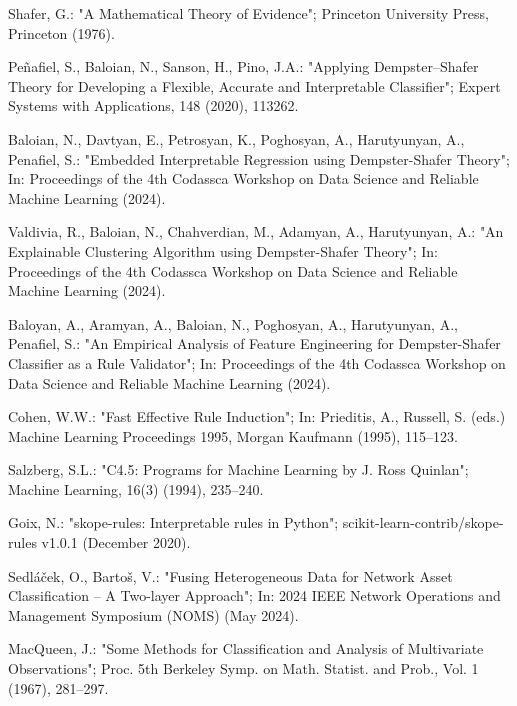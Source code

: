 \documentclass[10pt,a4paper,oneside]{article}
\begin{document}
\begin{thebibliography}{}{
\fontsize{9pt}{10pt}\selectfont
{}
Shafer, G.: "A Mathematical Theory of Evidence";
Princeton University Press, Princeton (1976).

Peñafiel, S., Baloian, N., Sanson, H., Pino, J.A.: "Applying Dempster–Shafer Theory for Developing a Flexible, Accurate and Interpretable Classifier";
Expert Systems with Applications, 148 (2020), 113262.

Baloian, N., Davtyan, E., Petrosyan, K., Poghosyan, A., Harutyunyan, A., Penafiel, S.:
"Embedded Interpretable Regression using Dempster-Shafer Theory";
In: Proceedings of the 4th Codassca Workshop on Data Science and Reliable Machine Learning (2024).

Valdivia, R., Baloian, N., Chahverdian, M., Adamyan, A., Harutyunyan, A.:
"An Explainable Clustering Algorithm using Dempster-Shafer Theory";
In: Proceedings of the 4th Codassca Workshop on Data Science and Reliable Machine Learning (2024).

Baloyan, A., Aramyan, A., Baloian, N., Poghosyan, A., Harutyunyan, A., Penafiel, S.:
"An Empirical Analysis of Feature Engineering for Dempster-Shafer Classifier as a Rule Validator";
In: Proceedings of the 4th Codassca Workshop on Data Science and Reliable Machine Learning (2024).

Cohen, W.W.: "Fast Effective Rule Induction";
In: Prieditis, A., Russell, S. (eds.) Machine Learning Proceedings 1995,
Morgan Kaufmann (1995), 115–123.

Salzberg, S.L.: "C4.5: Programs for Machine Learning by J. Ross Quinlan";
Machine Learning, 16(3) (1994), 235–240.

Goix, N.: "skope-rules: Interpretable rules in Python";
scikit-learn-contrib/skope-rules v1.0.1 (December 2020).

Sedláček, O., Bartoš, V.: "Fusing Heterogeneous Data for Network Asset Classification – A Two-layer Approach";
In: 2024 IEEE Network Operations and Management Symposium (NOMS) (May 2024).

MacQueen, J.: "Some Methods for Classification and Analysis of Multivariate Observations";
Proc. 5th Berkeley Symp. on Math. Statist. and Prob., Vol. 1 (1967), 281--297.

}
\end{thebibliography}
\end{document}
